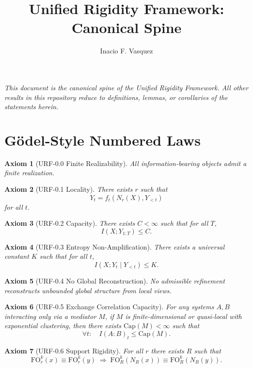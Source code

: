 \documentclass[11pt]{article}
\title{Unified Rigidity Framework:\\Canonical Spine}
\author{Inacio F. Vasquez}
\date{}
\newtheorem{axiom}{Axiom}
\begin{document}
\maketitle

\begin{center}
\emph{
This document is the canonical spine of the Unified Rigidity Framework.
All other results in this repository reduce to definitions, lemmas,
or corollaries of the statements herein.
}
\end{center}

\bigskip

\section*{Gödel-Style Numbered Laws}

\begin{axiom}[URF-0.0 Finite Realizability]
All information-bearing objects admit a finite realization.
\end{axiom}

\begin{axiom}[URF-0.1 Locality]
There exists $r$ such that
\[
Y_t = f_t\!\left(N_r(X), Y_{<t}\right)
\]
for all $t$.
\end{axiom}

\begin{axiom}[URF-0.2 Capacity]
There exists $C<\infty$ such that for all $T$,
\[
I(X;Y_{1:T}) \le C.
\]
\end{axiom}

\begin{axiom}[URF-0.3 Entropy Non-Amplification]
There exists a universal constant $K$ such that for all $t$,
\[
I(X;Y_t \mid Y_{<t}) \le K.
\]
\end{axiom}

\begin{axiom}[URF-0.4 No Global Reconstruction]
No admissible refinement reconstructs unbounded global structure from local views.
\end{axiom}

\begin{axiom}[URF-0.5 Exchange Correlation Capacity]
For any systems $A,B$ interacting only via a mediator $M$, if $M$ is
finite-dimensional or quasi-local with exponential clustering, then
there exists $\mathrm{Cap}(M)<\infty$ such that
\[
\forall t:\quad I(A:B)_t \le \mathrm{Cap}(M).
\]
\end{axiom}

\begin{axiom}[URF-0.6 Support Rigidity]
For all $r$ there exists $R$ such that
\[
\mathrm{FO}^k_r(x) \equiv \mathrm{FO}^k_r(y)
\;\Rightarrow\;
\mathrm{FO}^k_R(N_R(x)) \equiv \mathrm{FO}^k_R(N_R(y)).
\]
\end{axiom}
\end{document}
